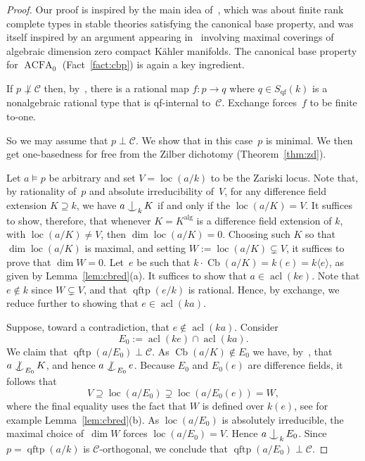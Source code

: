 \documentclass[\DocOpts]{amsart}
\theoremstyle{definition}
\def\acfa{\operatorname{ACFA}}
\def\cb{\operatorname{Cb}}
\def\qftp{\operatorname{qftp}}
\def\qf{\operatorname{qf}}
\def\acl{\operatorname{acl}}
\def\alg{{\operatorname{alg}}}
\def\loc{\operatorname{loc}}
\def\C{\mathcal{C}}
\newcommand{\<}{\langle}
\renewcommand{\>}{\rangle}
\def\Ind#1#2{#1\setbox0=\hbox{\(#1x\)}\kern\wd0\hbox to 
0pt{\hss\(#1\mid\)\hss}\lower.9\ht0\hbox to 
0pt{\hss\(#1\smile\)\hss}\kern\wd0}
\def\ind{\mathop{\mathpalette\Ind{}}}
\def\notind#1#2{#1\setbox0=\hbox{\(#1x\)}\kern\wd0\hbox to 
0pt{\mathchardef\nn=12854\hss\(#1\nn\)\kern1.4\wd0\hss}\hbox to 
0pt{\hss\(#1\mid\)\hss}\lower.9\ht0 \hbox to 
0pt{\hss\(#1\smile\)\hss}\kern\wd0}
\def\nind{\mathop{\mathpalette\notind{}}}
\begin{document}
\begin{proof}
Our proof is inspired by the main idea of~\cite[Proposition~6.1]{moosa-pillay2014}, which was about finite rank complete types in stable theories satisfying the canonical base property, and was itself inspired by an argument appearing in~\cite[Lemma~2.7]{COP} involving maximal coverings of algebraic dimension zero compact K\"ahler manifolds.
The canonical base property for $\acfa_0$ (Fact~\ref{fact:cbp}) is again a key ingredient.

If $p\not\perp\C$ then, by~\cite[Proposition~2.11]{qfint}, there is a rational map $f:p\to q$ where $q\in S_{\qf}(k)$ is a nonalgebraic rational type that is qf-internal to~$\C$.
Exchange forces~$f$ to be finite to-one.

So we may assume that $p\perp\C$.
We show that in this case~$p$ is minimal.
We then get one-basedness for free from the Zilber dichotomy (Theorem~\ref{thm:zd}).

Let $a\models p$ be arbitrary and set $V=\loc(a/k)$ to be the Zariski locus.
Note that, by rationality of~$p$ and absolute irreducibility of~$V$, for any difference field extension $K\supseteq k$, we have $a\ind_kK$ if and only if the $\loc(a/K)=V$.
It suffices to show, therefore, that whenever $K=K^{\alg}$  is a difference field extension of $k$, with $\loc(a/K)\neq V$, then $\dim\loc(a/K)=0$.
Choosing such $K$ so that $\dim\loc(a/K)$ is maximal, and setting $W:=\loc(a/K)\subsetneq V$, it suffices to prove that $\dim W=0$.
Let~$e$ be such that $k\cdot\cb(a/K)=k(e)=k\langle e\rangle$, as given by Lemma~\ref{lem:cbred}(a).
It suffices to show that $a\in\acl(ke)$.
Note that $e\notin k$ since $W\subsetneq V$, and that $\qftp(e/k)$ is rational.
Hence, by exchange, we reduce further to showing that $e\in\acl(ka)$.

Suppose, toward a contradiction, that $e\notin\acl(ka)$.
Consider
\[
E_0:=\acl(ke)\cap\acl(ka).
\]
We claim that $\qftp(a/E_0)\perp\C$.
As $\cb(a/K)\notin E_0$ we have, by~\cite[Lemma~2.5(a)]{qfint}, that 
$a\nind_{E_0}K$, and hence $a\nind_{E_0}e$.
Because $E_0$ and $E_0(e)$ are difference fields, it follows that
\[
V\supseteq \loc(a/E_0)\supsetneq \loc(a/E_0(e))=W,
\]
where the final equality uses the fact that $W$ is defined over $k(e)$, see for example Lemma~\ref{lem:cbred}(b).
As $\loc(a/E_0)$ is absolutely irreducible, the maximal choice of~$\dim W$ forces $\loc(a/E_0)=V$.
Hence $a\ind_kE_0$.
Since $p=\qftp(a/k)$ is $\C$-orthogonal, we conclude that 
$\qftp(a/E_0)\perp\C$.


\end{proof}
\end{document}
